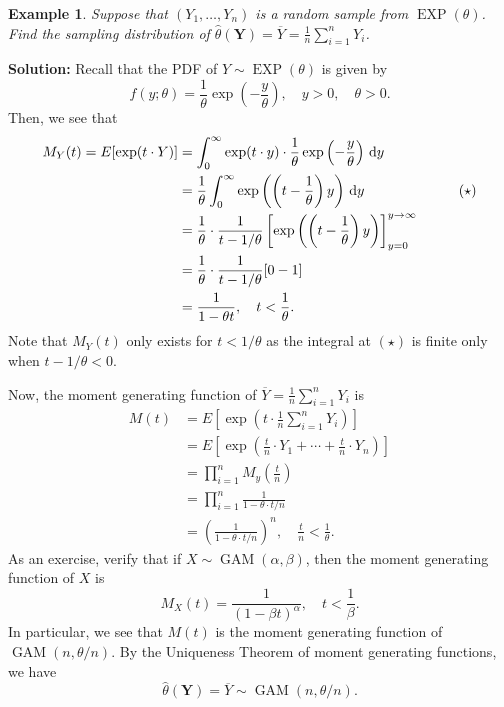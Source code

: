 \documentclass[10pt]{article}
\newcommand{\dd}{\,{\rm d}}
\DeclareMathOperator{\EXP}{EXP}
\DeclareMathOperator{\GAM}{GAM}
\theoremstyle{newstyle}
\newtheorem{exmp}[thm]{Example}
\begin{document}
\vspace{-3ex}
\begin{exmp}
Suppose that $(Y_1, \dots, Y_n)$ is a random sample from $\EXP(\theta)$. Find the 
sampling distribution of $\hat\theta(\mathbf Y) = \overline Y = \frac1n \sum_{i=1}^n Y_i$. 
\end{exmp}
{\color{blue}
{\bf Solution:} 
Recall that the PDF of $Y \sim \EXP(\theta)$ is given by 
\[ f(y; \theta) = \frac1\theta \exp \left( - \frac y\theta \right), \quad y > 0, \quad \theta > 0. \]
Then, we see that 
\begin{align*}
    M_Y(t) = E[\exp(t \cdot Y)] &= \int_0^\infty \exp(t \cdot y) \cdot \frac1\theta \exp\left( 
    -\frac y\theta \right)\dd y \\
    &= \frac1\theta \int_0^\infty \exp\left( \left(t - \frac1\theta \right)y \right) \dd y & \tag{$\star$} \\
    &= \frac1\theta \cdot \frac1{t-1/\theta} \left[ \exp \left( \left(t - \frac1\theta \right)y \right) 
    \right]_{y=0}^{y\to\infty} \\
    &= \frac1\theta \cdot \frac1{t-1/\theta} [0 - 1] \\
    &= \frac1{1-\theta t}, \quad t < \frac1\theta. 
\end{align*}
Note that $M_Y(t)$ only exists for $t < 1/\theta$ as the integral at $(\star)$ is finite only
when $t - 1/\theta < 0$. 

Now, the moment generating function of $\overline Y = \frac1n \sum_{i=1}^n Y_i$ is 
\begin{align*}
    M(t) &= E\left[ \exp \left(t \cdot \frac1n \sum_{i=1}^n Y_i \right) \right] \\
    &= E \left[ \exp \left( \frac tn \cdot Y_1 + \cdots + \frac tn \cdot Y_n \right) \right] \\
    &= \prod_{i=1}^n M_y \left( \frac tn \right) \\
    &= \prod_{i=1}^n \frac{1}{1-\theta \cdot t/n} \\
    &= \left( \frac{1}{1- \theta \cdot t/n} \right)^n, \quad \frac tn < \frac1\theta.
\end{align*}
As an exercise, verify that if $X \sim \GAM(\alpha, \beta)$, then the moment generating function of 
$X$ is 
\[ M_X(t) = \frac{1}{(1-\beta t)^\alpha}, \quad t < \frac1\beta. \]
In particular, we see that $M(t)$ is the moment generating function of $\GAM(n, \theta/n)$. 
By the Uniqueness Theorem of moment generating functions, we have 
\[ \hat\theta(\mathbf Y) = \overline Y \sim \GAM(n, \theta/n). \]
}
\end{document}
